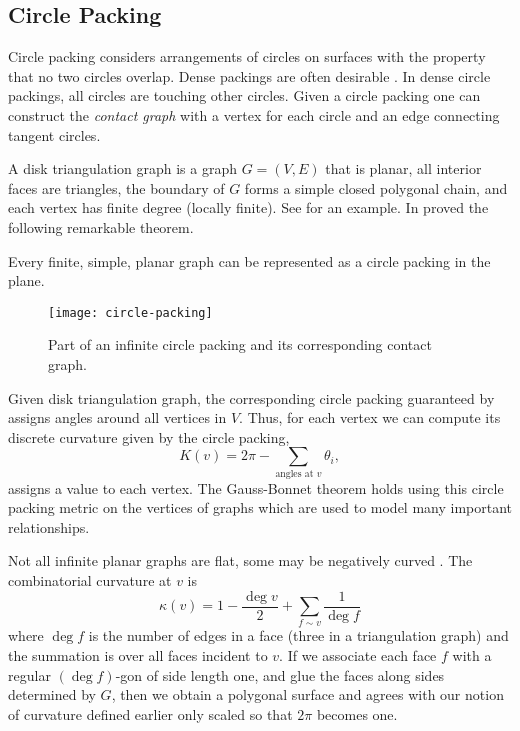 \subsection{Circle Packing}
\label{sec:circle-packing}


Circle packing considers arrangements of circles on surfaces
with the property that no two circles overlap. 
Dense packings are often desirable \cite{chang_simple_2010}.
In dense circle packings, all circles are touching other circles.
Given a circle packing one can construct the \emph{contact graph} with a vertex for each
circle and an edge connecting tangent circles.

A disk triangulation graph is a graph $G=(V,E)$ that is planar, all interior faces
are triangles, the boundary of $G$ forms a simple closed polygonal chain, and each
vertex has finite degree (locally finite).  See  for an example.
In  proved the following remarkable theorem.

\begin{theorem}\label{thm:kat}
Every finite, simple, planar graph can be represented as a circle packing in the plane.
\end{theorem}

\begin{figure}[htb]
        \centering
        \texttt{[image: circle-packing]}
		\caption{Part of an infinite circle packing and its corresponding contact graph.
		\label{fig:circle-packing}}
\end{figure}


Given disk triangulation graph, the corresponding circle packing guaranteed
by  assigns angles around all vertices in $V$.
Thus, for each vertex we can compute its discrete curvature given by
the circle packing,
$$K(v)=2\pi -\sum_{\text{angles at } v}\theta_i,$$
assigns a value to each vertex.
The Gauss-Bonnet theorem holds using this circle packing metric on the vertices
of graphs which are used to model many important relationships.


Not all infinite planar graphs are flat, some may be negatively curved \cite{higuchi_combinatorial_2001}.
The combinatorial curvature at $v$ is
\begin{equation}\label{eqn:combinatorial-curvature}
\kappa(v)=1-\frac{\deg v}{2}+\sum_{f\sim v}\frac{1}{\deg f}
\end{equation}
where $\deg f $ is the number of edges in a face (three in a triangulation graph) and
the summation is over all faces incident to $v.$ 
If we associate each face $f$ with a regular $(\deg f)$-gon
of side length one, and glue the faces along sides determined by $G$, then 
we obtain a polygonal surface and 
 agrees with our notion of curvature defined earlier only
scaled so that $2\pi$ becomes one.

